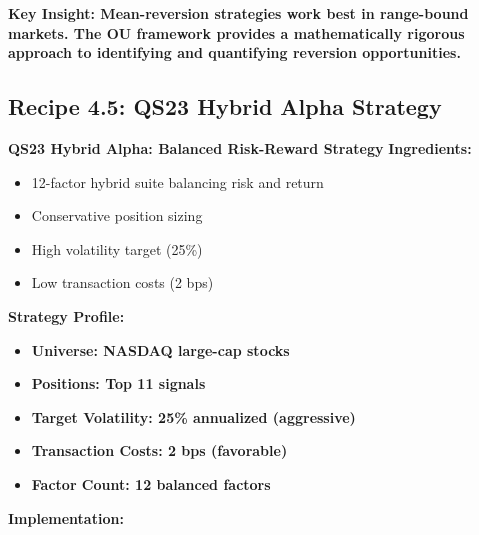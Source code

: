\documentclass[11pt,letterpaper,openany]{book}
\begin{document}
\textbf{Key Insight: Mean-reversion strategies work best in range-bound markets. The OU framework provides a mathematically rigorous approach to identifying and quantifying reversion opportunities.}

\subsection{Recipe 4.5: QS23 Hybrid Alpha Strategy}

\textbf{QS23 Hybrid Alpha: Balanced Risk-Reward Strategy}
\textbf{Ingredients:}
\begin{itemize}
    \item 12-factor hybrid suite balancing risk and return
    \item Conservative position sizing
    \item High volatility target (25\%)
    \item Low transaction costs (2 bps)
\end{itemize}
\textbf{Strategy Profile:}
\begin{itemize}
    \item \textbf{Universe: NASDAQ large-cap stocks}
    \item \textbf{Positions: Top 11 signals}
    \item \textbf{Target Volatility: 25\% annualized (aggressive)}
    \item \textbf{Transaction Costs: 2 bps (favorable)}
    \item \textbf{Factor Count: 12 balanced factors}
\end{itemize}
\textbf{Implementation:}
\end{document}
